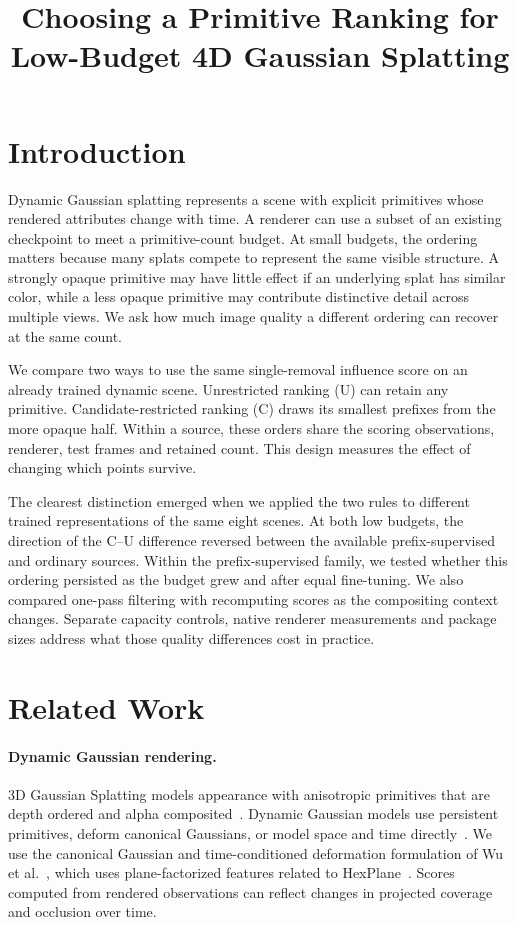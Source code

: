 \documentclass[pdflatex,sn-mathphys]{sn-jnl}
\title[Choosing a Ranking for Low-Budget 4DGS]{Choosing a Primitive Ranking for Low-Budget 4D Gaussian Splatting}
\author[1]{\fnm{Guangzi} \sur{Zhang}}
\author[1]{\fnm{Yulong} \sur{Pan}}
\author[1]{\fnm{Conglin} \sur{Ma}}
\author[1]{\fnm{Kaijie} \sur{Qu}}
\author*[1]{\fnm{Xingquan} \sur{Cai}}
\affil[1]{\orgdiv{Beijing Key Laboratory of Cross-Modal Intelligent Immersive Computing}, \orgname{North China University of Technology}, \orgaddress{\city{Beijing}, \postcode{100144}, \country{China}}}
\makeatletter
\newcommand{\runinheading}[2]{\def\toclevel@paragraph{#1}\paragraph{#2}}
\makeatother
\begin{document}
\maketitle

\section{Introduction}\label{sec:intro}
Dynamic Gaussian splatting represents a scene with explicit primitives whose rendered attributes change with time. A renderer can use a subset of an existing checkpoint to meet a primitive-count budget. At small budgets, the ordering matters because many splats compete to represent the same visible structure. A strongly opaque primitive may have little effect if an underlying splat has similar color, while a less opaque primitive may contribute distinctive detail across multiple views. We ask how much image quality a different ordering can recover at the same count.

We compare two ways to use the same single-removal influence score on an already trained dynamic scene. Unrestricted ranking (U) can retain any primitive. Candidate-restricted ranking (C) draws its smallest prefixes from the more opaque half. Within a source, these orders share the scoring observations, renderer, test frames and retained count. This design measures the effect of changing which points survive.

The clearest distinction emerged when we applied the two rules to different trained representations of the same eight scenes. At both low budgets, the direction of the C--U difference reversed between the available prefix-supervised and ordinary sources. Within the prefix-supervised family, we tested whether this ordering persisted as the budget grew and after equal fine-tuning. We also compared one-pass filtering with recomputing scores as the compositing context changes. Separate capacity controls, native renderer measurements and package sizes address what those quality differences cost in practice.

\section{Related Work}
\runinheading{2}{Dynamic Gaussian rendering.}
3D Gaussian Splatting models appearance with anisotropic primitives that are depth ordered and alpha composited~\cite{kerbl20233d}. Dynamic Gaussian models use persistent primitives, deform canonical Gaussians, or model space and time directly~\cite{luiten2024dynamic,wu20244d,yang2024deformable,li2024spacetime,duan20244d}. We use the canonical Gaussian and time-conditioned deformation formulation of Wu et al.~\cite{wu20244d}, which uses plane-factorized features related to HexPlane~\cite{cao2023hexplane}. Scores computed from rendered observations can reflect changes in projected coverage and occlusion over time.
\end{document}
